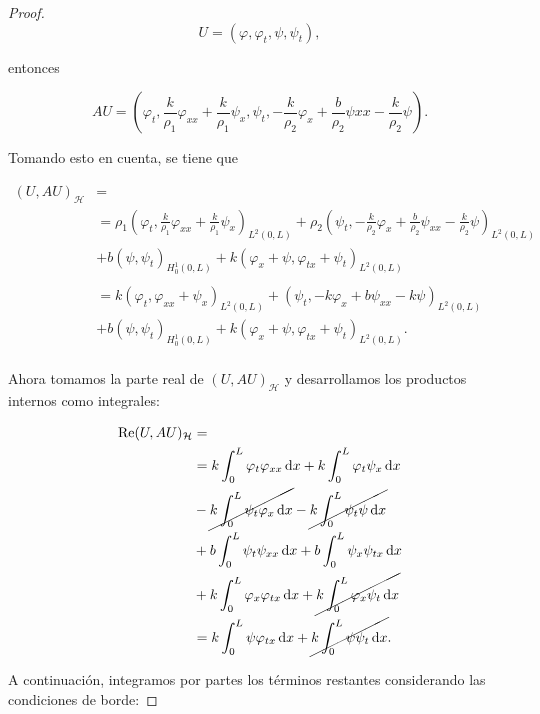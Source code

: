 \begin{proof}
    \[U = (\varphi, \varphi_t, \psi, \psi_t),\]

    entonces

    \[AU = \left(\varphi_t, \frac{k}{\rho_1}\varphi_{xx} + \frac{k}{\rho_1}\psi_x, \psi_t, -\frac{k}{\rho_2}\varphi_x + \frac{b}{\rho_2}\psi{xx} - \frac{k}{\rho_2}\psi \right).\]

    Tomando esto en cuenta, se tiene que

    \begin{align*}
        (U,AU)_{\mathcal{H}} &=\\
        &=\rho_1\left(\varphi_t, \frac{k}{\rho_1}\varphi_{xx} + \frac{k}{\rho_1}\psi_x \right)_{L^2(0,L)} + \rho_2\left(\psi_t, -\frac{k}{\rho_2}\varphi_x + \frac{b}{\rho_2}\psi_{xx} - \frac{k}{\rho_2}\psi \right)_{L^2(0,L)}
        \\&+ b(\psi, \psi_t)_{H_0^1(0,L)} + k(\varphi_x + \psi, \varphi_{tx} + \psi_t)_{L^2(0,L)}\\\\
        &=k\left(\varphi_t, \varphi_{xx} + \psi_x \right)_{L^2(0,L)} + \left(\psi_t, -k\varphi_x + b\psi_{xx} - k\psi \right)_{L^2(0,L)}
        \\&+ b(\psi, \psi_t)_{H_0^1(0,L)} + k(\varphi_x + \psi, \varphi_{tx} + \psi_t)_{L^2(0,L)}.\\
    \end{align*}

    Ahora tomamos la parte real de $(U,AU)_{\mathcal{H}}$ y desarrollamos los productos internos como integrales:

    \begin{align*}
        \operatorname{Re}(U,AU)_{\mathcal{H}} &=\\
        &= k\int_0^L \varphi_t \varphi_{xx} \, \mathrm{d} x + k\int_0^L\varphi_t \psi_x \, \mathrm{d} x\\
        &- \cancel{k\int_0^L\psi_t \varphi_x \, \mathrm{d} x} - \cancel{k\int_0^L \psi_t \psi \, \mathrm{d} x}\\
        &+ b\int_0^L \psi_t \psi_{xx} \, \mathrm{d} x + b \int_0^L \psi_x \psi_{tx} \, \mathrm{d} x\\
        &+ k\int_0^L \varphi_x \varphi_{tx} \, \mathrm{d} x + \cancel{k\int_0^L\varphi_x \psi_t \, \mathrm{d} x}\\
        &= k\int_0^L \psi \varphi_{tx} \, \mathrm{d} x + \cancel{k\int_0^L \psi \psi_t \, \mathrm{d} x}.
    \end{align*}

    A continuación, integramos por partes los términos restantes considerando las condiciones de borde:


\end{proof}
